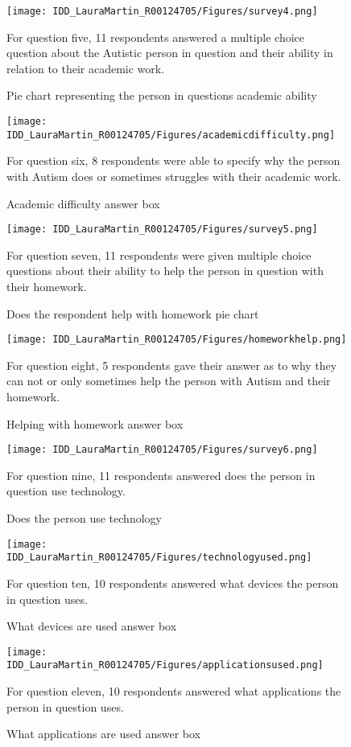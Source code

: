 \begin{figure}[b]
\centering
\texttt{[image: IDD\_LauraMartin\_R00124705/Figures/survey4.png]}
\caption{Pie chart representing the person in questions academic ability}
{For question five, 11 respondents answered a multiple choice question about the Autistic person in question and their ability in relation to their academic work.}
\end{figure}

\begin{figure}[b]
\centering
\texttt{[image: IDD\_LauraMartin\_R00124705/Figures/academicdifficulty.png]}
\caption{Academic difficulty answer box}
{For question six, 8 respondents were able to specify why the person with Autism does or sometimes struggles with their academic work.}
\end{figure}

\begin{figure}[b]
\centering
\texttt{[image: IDD\_LauraMartin\_R00124705/Figures/survey5.png]}
\caption{Does the respondent help with homework pie chart}
{For question seven, 11 respondents were given multiple choice questions about their ability to help the person in question with their homework.}
\end{figure}

\begin{figure}[b]
\centering
\texttt{[image: IDD\_LauraMartin\_R00124705/Figures/homeworkhelp.png]}
\caption{Helping with homework answer box}
{For question eight, 5 respondents gave their answer as to why they can not or only sometimes help the person with Autism and their homework. }
\end{figure}

\begin{figure}[b]
\centering
\texttt{[image: IDD\_LauraMartin\_R00124705/Figures/survey6.png]}
\caption{Does the person use technology}
{For question nine, 11 respondents answered does the person in question use technology.}
\end{figure}

\begin{figure}[b]
\centering
\texttt{[image: IDD\_LauraMartin\_R00124705/Figures/technologyused.png]}
\caption{What devices are used answer box}
{For question ten, 10 respondents answered what devices the person in question uses.}
\end{figure}

\begin{figure}[b]
\centering
\texttt{[image: IDD\_LauraMartin\_R00124705/Figures/applicationsused.png]}
\caption{What applications are used answer box}
{For question eleven, 10 respondents answered what applications the person in question uses. }
\end{figure}

